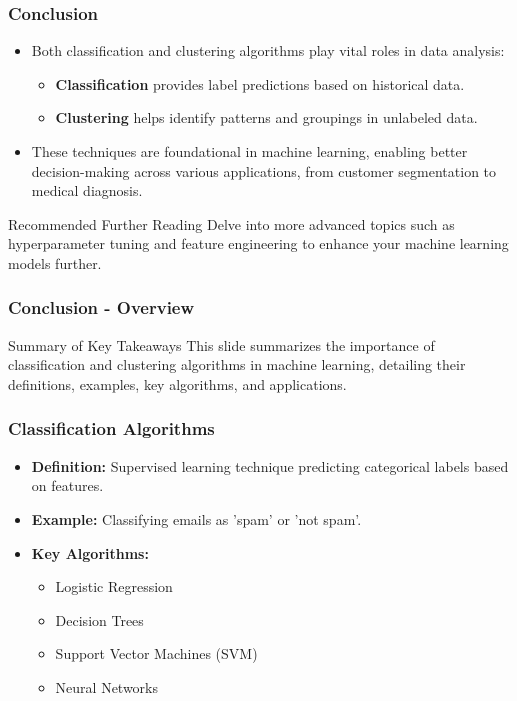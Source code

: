\documentclass[aspectratio=169]{beamer}
\begin{document}
\begin{frame}
    \frametitle{Conclusion}
    \begin{itemize}
        \item Both classification and clustering algorithms play vital roles in data analysis:
        \begin{itemize}
            \item \textbf{Classification} provides label predictions based on historical data.
            \item \textbf{Clustering} helps identify patterns and groupings in unlabeled data.
        \end{itemize}
        \item These techniques are foundational in machine learning, enabling better decision-making across various applications, from customer segmentation to medical diagnosis.
    \end{itemize}
    
    \begin{block}{Recommended Further Reading}
        Delve into more advanced topics such as hyperparameter tuning and feature engineering to enhance your machine learning models further.
    \end{block}
\end{frame}

\begin{frame}[fragile]
    \frametitle{Conclusion - Overview}
    \begin{block}{Summary of Key Takeaways}
        This slide summarizes the importance of classification and clustering algorithms in machine learning, detailing their definitions, examples, key algorithms, and applications.
    \end{block}
\end{frame}

\begin{frame}[fragile]
    \frametitle{Classification Algorithms}
    \begin{itemize}
        \item \textbf{Definition:} Supervised learning technique predicting categorical labels based on features.
        \item \textbf{Example:} Classifying emails as 'spam' or 'not spam'.
        \item \textbf{Key Algorithms:}
        \begin{itemize}
            \item Logistic Regression
            \item Decision Trees
            \item Support Vector Machines (SVM)
            \item Neural Networks
        \end{itemize}
    \end{itemize}
\end{frame}
\end{document}
